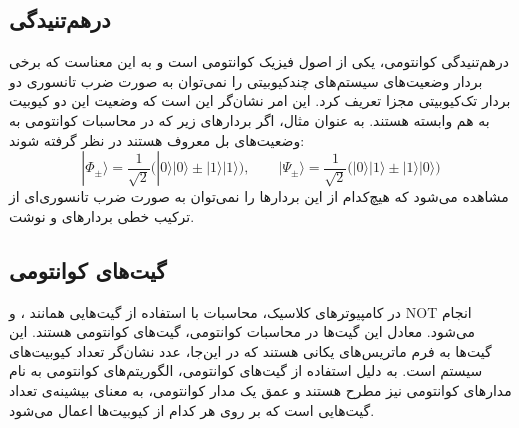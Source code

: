 \subsection{درهم‌تنیدگی}

درهم‌تنیدگی کوانتومی،
یکی از اصول فیزیک کوانتومی است و به این معناست که برخی بردار وضعیت‌های سیستم‌های چندکیوبیتی را نمی‌توان به صورت ضرب تانسوری دو بردار تک‌کیوبیتی مجزا تعریف کرد. این امر نشان‌گر این است که وضعیت این دو کیوبیت به هم وابسته هستند.
به عنوان مثال، اگر بردارهای زیر که در محاسبات کوانتومی به وضعیت‌های بل 
معروف هستند در نظر گرفته شوند:
\begin{equation}
|{\Phi_\pm}\rangle = \frac{1}{\sqrt 2}\big(|0\rangle| 0\rangle\pm |1\rangle| 1\rangle\big), \qquad |{\Psi_{\pm}}\rangle=\frac{1}{\sqrt 2}\big(|0\rangle| 1\rangle\pm  |1\rangle|0\rangle\big)
\end{equation}
\hsm
مشاهده می‌شود که هیچ‌کدام از این بردارها را نمی‌توان به صورت ضرب تانسوری‌ای از ترکیب خطی بردارهای
\lr{$|0\rangle$} و \lr{$|1\rangle$}
نوشت.

\subsection{گیت‌های کوانتومی}
در کامپیوترهای کلاسیک، محاسبات با استفاده از گیت‌هایی همانند 
،  و NOT
انجام می‌شود.
معادل این گیت‌ها در محاسبات کوانتومی، گیت‌های کوانتومی هستند. این گیت‌ها به فرم ماتریس‌های یکانی 
هستند که در این‌جا، عدد 
نشان‌گر تعداد کیوبیت‌های سیستم است.
به دلیل استفاده از گیت‌های کوانتومی، الگوریتم‌های کوانتومی به نام مدارهای کوانتومی نیز مطرح هستند و عمق یک مدار کوانتومی، به معنای بیشینه‌ی تعداد گیت‌هایی است که بر روی هر کدام از کیوبیت‌ها اعمال می‌شود.
